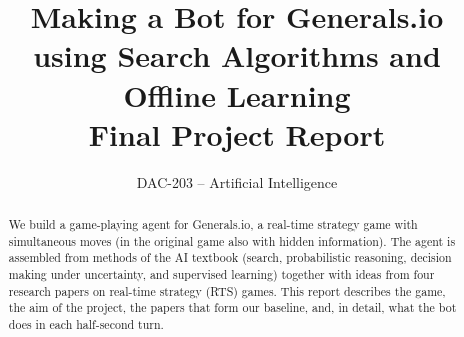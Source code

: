 \documentclass[11pt,a4paper]{article}
\title{\textbf{Making a Bot for Generals.io}\\[2pt]
\textbf{using Search Algorithms and Offline Learning}\\[4pt]
\large Final Project Report}
\author{DAC-203 -- Artificial Intelligence}
\date{}
\begin{document}
\maketitle

\begin{abstract}
We build a game-playing agent for Generals.io, a real-time strategy game with simultaneous moves (in the original game also with
hidden information). The agent is assembled from methods of the AI textbook (search, probabilistic
reasoning, decision making under uncertainty, and supervised learning) together with ideas from four
research papers on real-time strategy (RTS) games. This report describes the game, the aim of the
project, the papers that form our baseline, and, in detail, what the bot does in each half-second turn.
\end{abstract}


\end{document}
